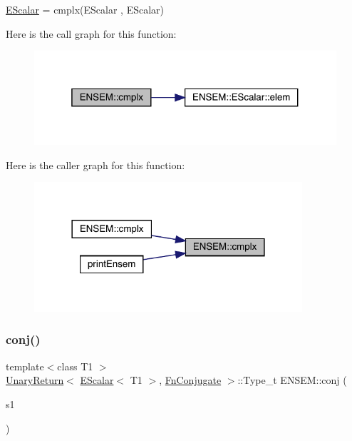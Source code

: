 \mbox{\hyperlink{classENSEM_1_1EScalar}{E\+Scalar}} = cmplx(\+E\+Scalar , E\+Scalar) 

Here is the call graph for this function\+:\nopagebreak
\begin{figure}[H]
\begin{center}
\leavevmode
\includegraphics[width=319pt]{d4/dca/group__escalar_gaccbb7d66b912e8f0972f4e50095f296e_cgraph}
\end{center}
\end{figure}
Here is the caller graph for this function\+:\nopagebreak
\begin{figure}[H]
\begin{center}
\leavevmode
\includegraphics[width=282pt]{d4/dca/group__escalar_gaccbb7d66b912e8f0972f4e50095f296e_icgraph}
\end{center}
\end{figure}
\mbox{\label{group__escalar_ga291c7e9b7f872b3e6db0d75ff3421b6a}} 
\subsubsection{\texorpdfstring{conj()}{conj()}}
{\footnotesize\ttfamily template$<$class T1 $>$ \\
\mbox{\hyperlink{structENSEM_1_1UnaryReturn}{Unary\+Return}}$<$ \mbox{\hyperlink{classENSEM_1_1EScalar}{E\+Scalar}}$<$ T1 $>$, \mbox{\hyperlink{structENSEM_1_1FnConjugate}{Fn\+Conjugate}} $>$\+::Type\+\_\+t E\+N\+S\+E\+M\+::conj (\begin{DoxyParamCaption}\item[{const \mbox{\hyperlink{classENSEM_1_1EScalar}{E\+Scalar}}$<$ T1 $>$ \&}]{s1 }\end{DoxyParamCaption})\hspace{0.3cm}{\ttfamily [inline]}}

